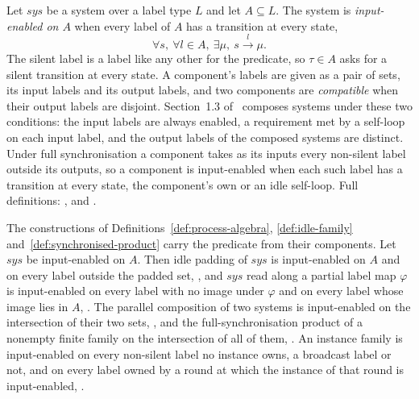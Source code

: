 \begin{definition}
  \label{def:input-enabledness}
  \leanok
  Let $sys$ be a system over a label type $L$ and let $A \subseteq L$.
  The system is \emph{input-enabled on $A$} when every label of $A$ has a transition at every state,
  \[
    \forall s,\ \forall l \in A,\ \exists \mu,\ s \xrightarrow{\;l\;} \mu .
  \]
  The silent label is a label like any other for the predicate, so $\tau \in A$ asks for a silent transition at every state.
  A component's labels are given as a pair of sets, its input labels and its output labels, and two components are \emph{compatible} when their output labels are disjoint.
  Section~1.3 of~\cite{LeslieBP} composes systems under these two conditions: the input labels are always enabled, a requirement met by a self-loop on each input label, and the output labels of the composed systems are distinct.
  Under full synchronisation a component takes as its inputs every non-silent label outside its outputs, so a component is input-enabled when each such label has a transition at every state, the component's own or an idle self-loop.
  Full definitions: ,  and .

  The constructions of Definitions~\ref{def:process-algebra}, \ref{def:idle-family} and~\ref{def:synchronised-product} carry the predicate from their components.
  Let $sys$ be input-enabled on $A$.
  Then idle padding of $sys$ is input-enabled on $A$ and on every label outside the padded set, , and $sys$ read along a partial label map $\varphi$ is input-enabled on every label with no image under $\varphi$ and on every label whose image lies in $A$, .
  The parallel composition of two systems is input-enabled on the intersection of their two sets, , and the full-synchronisation product of a nonempty finite family on the intersection of all of them, .
  An instance family is input-enabled on every non-silent label no instance owns, a broadcast label or not, and on every label owned by a round at which the instance of that round is input-enabled, .
\end{definition}
